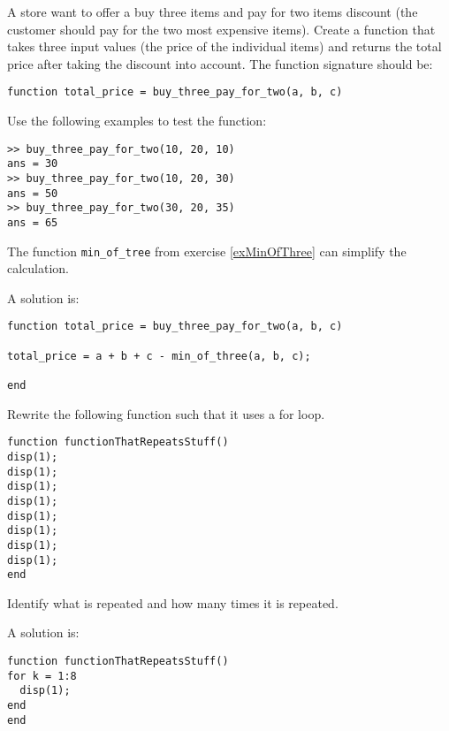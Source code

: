 \begin{ex}
\label{exThreeForThePriceOfTwo}%
A store want to offer a buy three items and pay for two items 
discount (the customer should pay for the two most 
expensive items).
Create a function that takes three input values (the price of the individual items) and returns the total price after taking 
the discount into account.
The function signature should be:
\begin{lstlisting}
function total_price = buy_three_pay_for_two(a, b, c)
\end{lstlisting}
Use the following examples to test the function:
\begin{lstlisting}
>> buy_three_pay_for_two(10, 20, 10)
ans = 30
>> buy_three_pay_for_two(10, 20, 30)
ans = 50
>> buy_three_pay_for_two(30, 20, 35)
ans = 65
\end{lstlisting}
\begin{hint}
The function \verb!min_of_tree! from exercise \ref{exMinOfThree} 
can simplify the calculation.
\end{hint}
\begin{sol}
A solution is:
\begin{lstlisting}
function total_price = buy_three_pay_for_two(a, b, c)

total_price = a + b + c - min_of_three(a, b, c);

end
\end{lstlisting}
\end{sol}
\end{ex}



\begin{ex}
Rewrite the following function such that it uses a for loop.

\begin{lstlisting}
function functionThatRepeatsStuff()
disp(1);
disp(1);
disp(1);
disp(1);
disp(1);
disp(1);
disp(1);
disp(1);
end
\end{lstlisting}
\begin{hint}
Identify what is repeated and how many times it is repeated.
\end{hint}
\begin{sol}
A solution is:
\begin{lstlisting}
function functionThatRepeatsStuff()
for k = 1:8
  disp(1);
end
end
\end{lstlisting}
\end{sol}
\end{ex}




